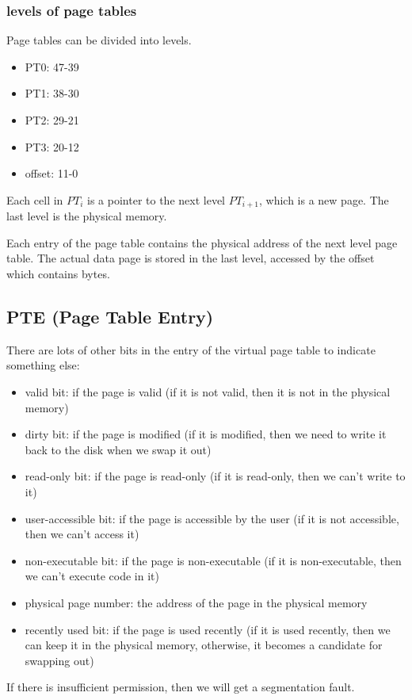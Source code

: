 \documentclass[letterpaper,12pt]{article}
\begin{document}
\subsubsection{levels of page tables}
Page tables can be divided into levels.

\begin{itemize}
    \item PT0: 47-39
    \item PT1: 38-30
    \item PT2: 29-21
    \item PT3: 20-12
    \item offset: 11-0
\end{itemize}
Each cell in $PT_i$ is a pointer to the next level $PT_{i+1}$, which is a new page. The last level is the physical memory.

Each entry of the page table contains the physical address of the next level
page table. The actual data page is stored in the last level, accessed by the
offset which contains bytes.
\subsection{PTE (Page Table Entry)}
There are lots of other bits in the entry of the virtual page table to indicate
something else:\begin{itemize}
    \item valid bit: if the page is valid (if it is not valid, then it is not in the
          physical memory)
    \item dirty bit: if the page is modified (if it is modified, then we need to write it
          back to the disk when we swap it out)
    \item read-only bit: if the page is read-only (if it is read-only, then we can't
          write to it)
    \item user-accessible bit: if the page is accessible by the user (if it is not
          accessible, then we can't access it)
    \item non-executable bit: if the page is non-executable (if it is non-executable,
          then we can't execute code in it)
    \item physical page number: the address of the page in the physical memory
    \item recently used bit: if the page is used recently (if it is used recently, then
          we can keep it in the physical memory, otherwise, it becomes a candidate for
          swapping out)
\end{itemize}
If there is insufficient permission, then we will get a segmentation fault.
\end{document}
